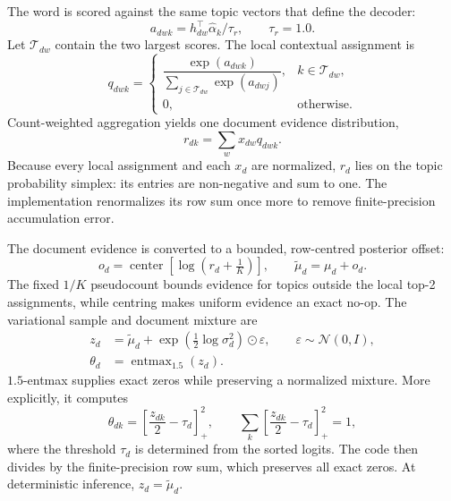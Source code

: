\documentclass[10pt,a4paper]{article}
\newcommand{\centerop}{\operatorname{center}}
\newcommand{\entmax}{\operatorname{entmax}_{1.5}}
\begin{document}
The word is scored against the same topic vectors that define the decoder:
\begin{equation}
  a_{dwk}=h_{dw}^{\top}\widehat\alpha_k/\tau_r,
  \qquad \tau_r=1.0.
  \label{eq:routing-score}
\end{equation}
Let $\mathcal T_{dw}$ contain the two largest scores. The local contextual
assignment is
\begin{equation}
  q_{dwk}=
  \begin{cases}
    \dfrac{\exp(a_{dwk})}
    {\sum_{j\in\mathcal T_{dw}}\exp(a_{dwj})},
    & k\in\mathcal T_{dw},\\[8pt]
    0, & \text{otherwise}.
  \end{cases}
  \label{eq:top2-route}
\end{equation}
Count-weighted aggregation yields one document evidence distribution,
\begin{equation}
  r_{dk}=\sum_w x_{dw}q_{dwk}.
  \label{eq:document-evidence}
\end{equation}
Because every local assignment and each $x_d$ are normalized, $r_d$ lies on the
topic probability simplex: its entries are non-negative and sum to one. The
implementation renormalizes its row sum once more to remove finite-precision
accumulation error.

The document evidence is converted to a bounded, row-centred posterior offset:
\begin{equation}
  o_d=\centerop\!\left[\log\left(r_d+\tfrac1K\right)\right],
  \qquad
  \widetilde\mu_d=\mu_d+o_d.
  \label{eq:posterior-offset}
\end{equation}
The fixed $1/K$ pseudocount bounds evidence for topics outside the local top-2
assignments, while centring makes uniform evidence an exact no-op. The variational sample and
document mixture are
\begin{align}
  z_d&=\widetilde\mu_d+
  \exp\!\left(\tfrac12\log\sigma_d^2\right)\odot\varepsilon,
  \qquad \varepsilon\sim\mathcal N(0,I),\\
  \theta_d&=\entmax(z_d).
  \label{eq:theta}
\end{align}
$1.5$-entmax supplies exact zeros while preserving a normalized mixture. More
explicitly, it computes
\begin{equation}
  \theta_{dk}=\left[\frac{z_{dk}}{2}-\tau_d\right]_+^2,
  \qquad
  \sum_k\left[\frac{z_{dk}}{2}-\tau_d\right]_+^2=1,
  \label{eq:entmax-closed-form}
\end{equation}
where the threshold $\tau_d$ is determined from the sorted logits. The code
then divides by the finite-precision row sum, which preserves all exact zeros.
At deterministic inference, $z_d=\widetilde\mu_d$.
\end{document}
